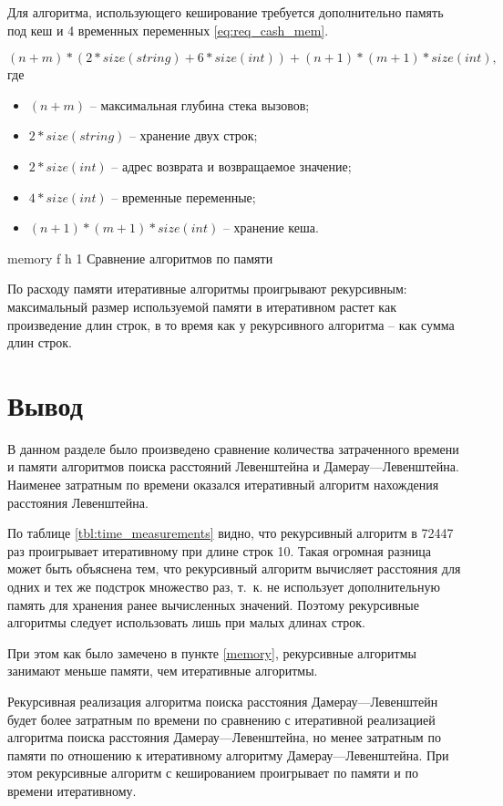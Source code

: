 Для алгоритма, использующего кеширование требуется дополнительно память под кеш и 4 временных переменных \eqref{eq:req_cash_mem}.

\begin{equation}
	\label{eq:req_cash_mem}
	(n + m) * (2 * size(string) + 6 * size(int)) + (n + 1) * (m + 1) * size(int),
\end{equation}
где 
\begin{itemize}
	\item $ (n + m) $ -- максимальная глубина стека вызовов;
	\item $ 2 * size(string) $ -- хранение двух строк;
	\item $ 2 * size(int) $ -- адрес возврата и возвращаемое значение;
	\item $ 4 * size(int) $ -- временные переменные;
	\item $ (n + 1) * (m + 1) * size(int) $ -- хранение кеша.
\end{itemize}

{memory} %
{f} %
{h} %
{1\textwidth} %
{Сравнение алгоритмов по памяти} %

По расходу памяти итеративные алгоритмы проигрывают рекурсивным: максимальный размер используемой памяти в итеративном растет
как произведение длин строк, в то время как у рекурсивного алгоритма --
как сумма длин строк.


\section*{Вывод}

В данном разделе было произведено сравнение количества затраченного времени и памяти алгоритмов поиска расстояний Левенштейна и
Дамерау---Левенштейна. Наименее затратным по времени оказался итеративный алгоритм нахождения расстояния Левенштейна.

По таблице \ref{tbl:time_measurements} видно, что рекурсивный алгоритм в 72447 раз проигрывает итеративному при длине строк 10. Такая огромная разница может быть объяснена тем, что рекурсивный алгоритм вычисляет расстояния для одних и тех же подстрок множество раз, т.~к. не использует дополнительную память для хранения ранее вычисленных значений. Поэтому рекурсивные алгоритмы следует использовать лишь при малых длинах строк.

При этом как было замечено в пункте \ref{memory}, рекурсивные алгоритмы занимают меньше памяти, чем итеративные алгоритмы.

Рекурсивная реализация алгоритма поиска расстояния Дамерау---Левенштейн будет более затратным по времени по сравнению с итеративной реализацией алгоритма поиска расстояния Дамерау---Левенштейна, но менее затратным по памяти по отношению к итеративному алгоритму Дамерау---Левенштейна. При этом рекурсивные алгоритм с кешированием проигрывает по памяти и по времени итеративному.